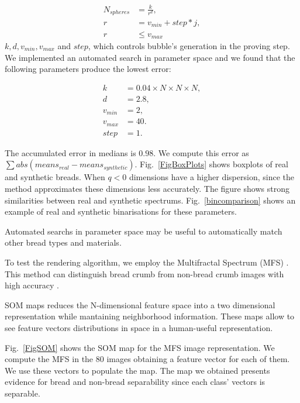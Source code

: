 \documentclass[final,5p,times]{elsarticle}
\begin{document}
\begin{align}
N_{spheres} &= \frac{k}{r^{d}},\\ r &= v_{min}+step*j,\\ r &\le v_{max} 
\end{align}
$k,d,v_{min},v_{max}$ and $step$, which controls bubble's generation in the proving step. We implemented an automated search in parameter space and we found that the following parameters produce the lowest error:

\begin{align*}
k &= 0.04\times N\times N\times N ,\\
d &=2.8,\\
v_{min} &=2,\\
v_{max} &=40.\\
step &=1.
\end{align*}

The accumulated error in medians is $0.98$. We compute this error as $\displaystyle \sum abs(means_{real}-means_{synthetic})$. Fig.~\ref{FigBoxPlots} shows boxplots of real and synthetic breads. When $q < 0$ dimensions have a higher dispersion, since the method approximates these dimensions less accurately. The figure shows strong similarities between real and synthetic spectrums.  Fig.~\ref{bincomparison} shows an example of real and synthetic binarisations for these parameters.

Automated searchs in parameter space may be useful to automatically match other bread types and materials.

To test the rendering algorithm, we employ the Multifractal Spectrum (MFS) \cite{Xu2009}. This method can distinguish bread crumb from non-bread crumb images with high accuracy  \cite{Baravalle2012}.

SOM maps \cite{Kohonen2001} reduces the N-dimensional feature space into a two dimensional representation while mantaining neighborhood information. These maps allow to see feature vectors distributions in space in a human-useful representation.

Fig.~\ref{FigSOM} shows the SOM map for the MFS image representation. We compute the MFS in the $80$ images obtaining a feature vector for each of them. We use these vectors to populate the map. The map we obtained presents evidence for bread and non-bread separability since each class' vectors is separable.
\end{document}
